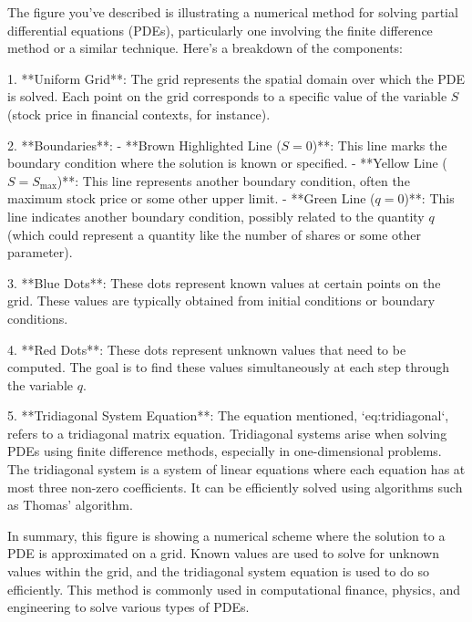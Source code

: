 The figure you've described is illustrating a numerical method for solving partial differential equations (PDEs), particularly one involving the finite difference method or a similar technique. Here's a breakdown of the components:

1. **Uniform Grid**: The grid represents the spatial domain over which the PDE is solved. Each point on the grid corresponds to a specific value of the variable \( S \) (stock price in financial contexts, for instance).

2. **Boundaries**:
   - **Brown Highlighted Line (\( S = 0 \))**: This line marks the boundary condition where the solution is known or specified.
   - **Yellow Line (\( S = S_{\text{max}} \))**: This line represents another boundary condition, often the maximum stock price or some other upper limit.
   - **Green Line (\( q = 0 \))**: This line indicates another boundary condition, possibly related to the quantity \( q \) (which could represent a quantity like the number of shares or some other parameter).

3. **Blue Dots**: These dots represent known values at certain points on the grid. These values are typically obtained from initial conditions or boundary conditions.

4. **Red Dots**: These dots represent unknown values that need to be computed. The goal is to find these values simultaneously at each step through the variable \( q \).

5. **Tridiagonal System Equation**: The equation mentioned, `eq:tridiagonal`, refers to a tridiagonal matrix equation. Tridiagonal systems arise when solving PDEs using finite difference methods, especially in one-dimensional problems. The tridiagonal system is a system of linear equations where each equation has at most three non-zero coefficients. It can be efficiently solved using algorithms such as Thomas' algorithm.

In summary, this figure is showing a numerical scheme where the solution to a PDE is approximated on a grid. Known values are used to solve for unknown values within the grid, and the tridiagonal system equation is used to do so efficiently. This method is commonly used in computational finance, physics, and engineering to solve various types of PDEs.